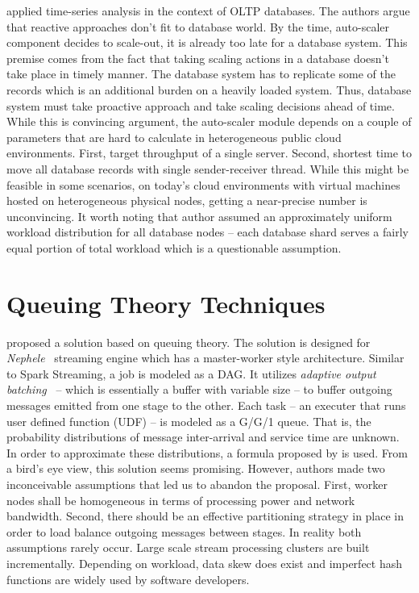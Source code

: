 \textcite{Taft:2018} applied time-series analysis in the context of OLTP databases. The authors argue that reactive approaches don't fit to database world. By the time, auto-scaler component decides to scale-out, it is already too late for a database system. This premise comes from the fact that taking scaling actions in a database doesn't take place in timely manner. The database system has to replicate some of the records which is an additional burden on a heavily loaded system. Thus, database system must take proactive approach and take scaling decisions ahead of time. While this is convincing argument, the auto-scaler module depends on a couple of parameters that are hard to calculate in heterogeneous public cloud environments. First, target throughput of a single server. Second, shortest time to move all database records with single sender-receiver thread. While this might be feasible in some scenarios, on today's cloud environments with virtual machines hosted on heterogeneous physical nodes, getting a near-precise number is unconvincing. It worth noting that author assumed an approximately uniform workload distribution for all database nodes -- each database shard serves a fairly equal portion of total workload which is a questionable assumption.

\section{Queuing Theory Techniques}
\label{related:qt}

\textcite{Lohrmann:2015} proposed a solution based on queuing theory. The solution is designed for \emph{Nephele}~\cite{Lohrmann:2014} streaming engine which has a master-worker style architecture. Similar to Spark Streaming, a job is modeled as a DAG. It utilizes \emph{adaptive output batching}~\cite{Warneke:2011} -- which is essentially a buffer with variable size -- to buffer outgoing messages emitted from one stage to the other. Each task -- an executer that runs user defined function (UDF) -- is modeled as a G/G/1 queue. That is, the probability distributions of message inter-arrival and service time are unknown. In order to approximate these distributions, a formula proposed by \textcite{Kingman:1961} is used. From a bird's eye view, this solution seems promising. However, authors made two inconceivable assumptions that led us to abandon the proposal. First, worker nodes shall be homogeneous in terms of processing power and network bandwidth. Second, there should be an effective partitioning strategy in place in order to load balance outgoing messages between stages. In reality both assumptions rarely occur. Large scale stream processing clusters are built incrementally. Depending on workload, data skew does exist and imperfect hash functions are widely used by software developers.

